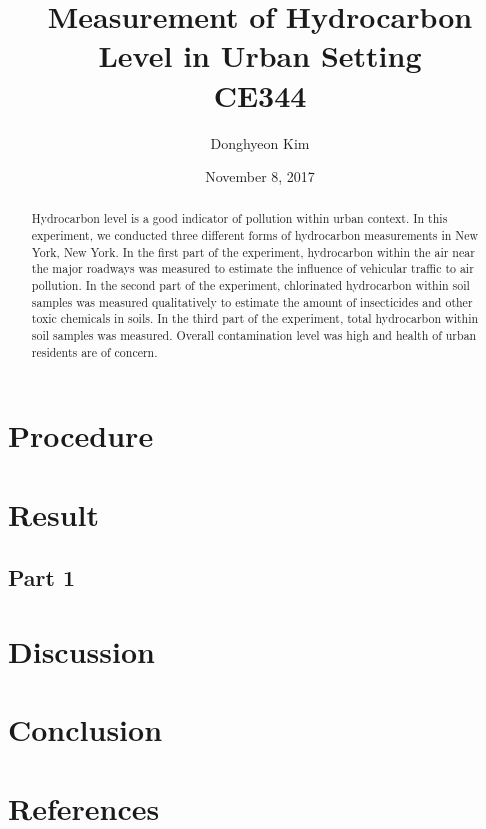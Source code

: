 \documentclass{article}
\begin{document}
\begin{titlepage}
\title{\bfseries Measurement of Hydrocarbon Level in Urban Setting \\
	\large CE344}
\author{Donghyeon Kim}
\date{November 8, 2017}
\maketitle
\thispagestyle{empty}
\end{titlepage}

\begin{abstract}
Hydrocarbon level is a good indicator of pollution within urban context. In this experiment, we conducted three different forms of hydrocarbon measurements in New York, New York. In the first part of the experiment, hydrocarbon within the air near the major roadways was measured to estimate the influence of vehicular traffic to air pollution. In the second part of the experiment, chlorinated hydrocarbon within soil samples was measured qualitatively to estimate the amount of insecticides and other toxic chemicals in soils. In the third part of the experiment, total hydrocarbon within soil samples was measured. Overall contamination level was high and health of urban residents are of concern.
\end{abstract}

\tableofcontents
\listoffigures
\listoftables
\thispagestyle{empty}
\newpage

\setcounter{page}{1}
\section{Procedure}\label{sec:procedure}

\section{Result}\label{sec:result}
\subsection{Part 1}

\section{Discussion}\label{sec:discussion}

\section{Conclusion}\label{sec:conclusion}

\section{References}\label{sec:ref}
\end{document}
